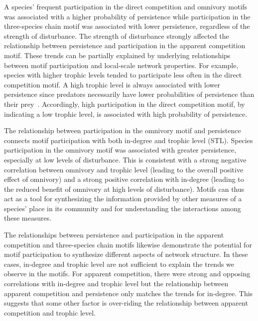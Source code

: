 \documentclass[12pt]{article}
\begin{document}
\begin{spacing}{2.0}
    
    A species' frequent participation in the direct competition and omnivory motifs was associated with a higher probability of persistence while participation in the three-species chain motif was associated with lower persistence, regardless of the strength of disturbance.
    The strength of disturbance strongly affected the relationship between persistence and participation in the apparent competition motif.
    These trends can be partially explained by underlying relationships between motif participation and local-scale network properties.
    For example, species with higher trophic levels tended to participate less often in the direct competition motif.
    A high trophic level is always associated with lower persistence since predators necessarily have lower probabilities of persistence than their prey~\citep{Eklof2013}.
    Accordingly, high participation in the direct competition motif, by indicating a low trophic level, is associated with high probability of persistence.
    
    
    The relationship between participation in the omnivory motif and persistence connects motif participation with both in-degree and trophic level (STL).
    Species participation in the omnivory motif was associated with greater persistence, especially at low levels of disturbance.
    This is consistent with a strong negative correlation between omnivory and trophic level (leading to the overall positive effect of omnivory) and a strong positive correlation with in-degree (leading to the reduced benefit of omnivory at high levels of disturbance). 
    Motifs can thus act as a tool for synthesizing the information provided by other measures of a species' place in its community and for understanding the interactions among these measures.
    
    
    The relationships between persistence and participation in the apparent competition and three-species chain motifs likewise demonstrate the potential for motif participation to synthesize different aspects of network structure.
    In these cases, in-degree and trophic level are not sufficient to explain the trends we observe in the motifs.
    For apparent competition, there were strong and opposing correlations with in-degree and trophic level but the relationship between apparent competition and persistence only matches the trends for in-degree.
    This suggests that some other factor is over-riding the relationship between apparent competition and trophic level.
    

\end{spacing}
\end{document}
